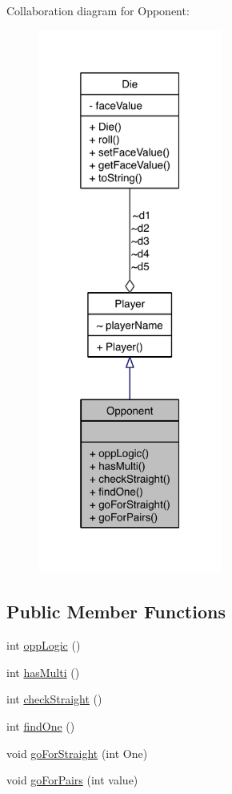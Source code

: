 Collaboration diagram for Opponent\-:\nopagebreak
\begin{figure}[H]
\begin{center}
\leavevmode
\includegraphics[width=172pt]{class_opponent__coll__graph}
\end{center}
\end{figure}
\subsection*{Public Member Functions}
\begin{DoxyCompactItemize}
\item 
int \hyperlink{class_opponent_a21dc0a88cbc3620ab78bf94a1ef3eb83}{opp\-Logic} ()
\item 
int \hyperlink{class_opponent_a35ce9e9427404b94f2cb7a3f812d2707}{has\-Multi} ()
\item 
int \hyperlink{class_opponent_afa3112090a78a2d9506c3fba37556700}{check\-Straight} ()
\item 
int \hyperlink{class_opponent_a3670cd1623069075c9a5a42091ef438a}{find\-One} ()
\item 
void \hyperlink{class_opponent_aafdee9152eb58557fd822efe83f7f820}{go\-For\-Straight} (int One)
\item 
void \hyperlink{class_opponent_a3cbde8a44023b31707b1b2e867d3d095}{go\-For\-Pairs} (int value)
\end{DoxyCompactItemize}
